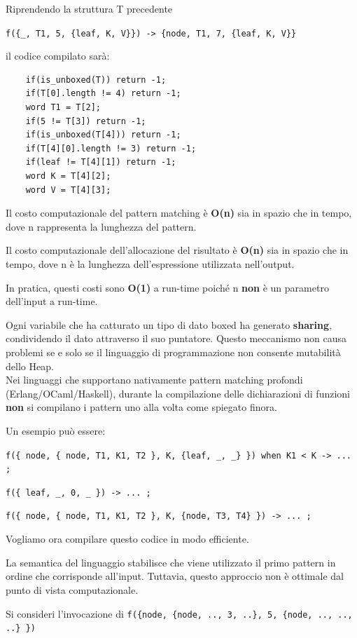 \documentclass{article}
\begin{document}
Riprendendo la struttura T precedente 
\begin{center}
    \texttt{f(\{\_, T1, 5, \{leaf, K, V\}\}) -> \{node, T1, 7, \{leaf, K, V\}\}}
\end{center}
il codice compilato sarà:
\begin{verbatim}
    if(is_unboxed(T)) return -1;
    if(T[0].length != 4) return -1;
    word T1 = T[2];
    if(5 != T[3]) return -1;
    if(is_unboxed(T[4])) return -1;
    if(T[4][0].length != 3) return -1;
    if(leaf != T[4][1]) return -1;
    word K = T[4][2];
    word V = T[4][3];
\end{verbatim}

Il costo computazionale del pattern matching è \textbf{O(n)} sia in spazio che in tempo, dove n rappresenta la lunghezza del pattern.

Il costo computazionale dell'allocazione del risultato è \textbf{O(n)} sia in spazio che in tempo, dove n è la lunghezza dell'espressione utilizzata nell'output.

In pratica, questi costi sono \textbf{O(1)} a run-time poiché n \textbf{non} è un parametro dell'input a run-time.

Ogni variabile che ha catturato un tipo di dato boxed ha generato \textbf{sharing}, condividendo il dato attraverso il suo puntatore. Questo meccanismo non causa problemi se e solo se il linguaggio di programmazione non consente mutabilità dello Heap.\vspace{14pt}\\
Nei linguaggi che supportano nativamente pattern matching profondi (Erlang/OCaml/Haskell), durante la compilazione delle dichiarazioni di funzioni \textbf{non} si compilano i pattern uno alla volta come spiegato finora.

Un esempio può essere:
\begin{center}
    \texttt{f(\{ node, \{ node, T1, K1, T2 \}, K, \{leaf, \_, \_\} \}) when K1 < K -> ... ;}

    \texttt{f(\{ leaf, \_, 0, \_ \}) -> ... ;}

    \texttt{f(\{ node, \{ node, T1, K1, T2 \}, K, \{node, T3, T4\} \}) -> ... ;}
\end{center}
Vogliamo ora compilare questo codice in modo efficiente.

La semantica del linguaggio stabilisce che viene utilizzato il primo pattern in ordine che corrisponde all'input. Tuttavia, questo approccio non è ottimale dal punto di vista computazionale.

Si consideri l'invocazione di \texttt{f(\{node, \{node, .., 3, ..\}, 5, \{node, .., .., ..\} \})}
\end{document}
